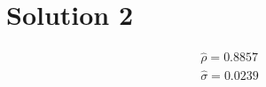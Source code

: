 \documentclass[10pt,a4paper]{article}
\begin{document}
\section*{Solution 2}
  \begin{gather*}
    \hat{\rho} = 0.8857 \\
    \hat{\sigma} = 0.0239
  \end{gather*}
\end{document}
